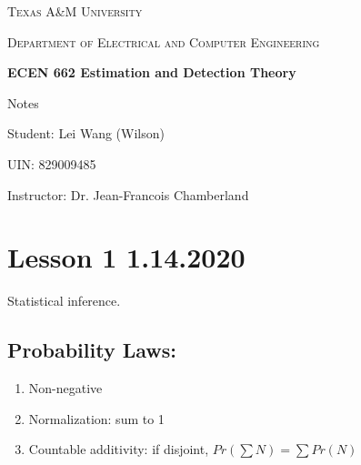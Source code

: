 \documentclass[11pt,letterpaper,titlepage]{article}
\begin{document}
\begin{titlepage}
  \centering
	{\scshape\large Texas A\&M University \par}
	\vspace{1cm}
	{\scshape\Large Department of Electrical and Computer Engineering \par}
	\vspace{4cm}
    \vspace{0.5cm}
	{\huge\bfseries ECEN 662 Estimation and Detection Theory\par}
	\vspace{4cm}
	{\Large Notes\par}
	\vspace{1cm}
	{\Large Student: Lei Wang (Wilson)\par}
	\vspace{1cm}
	{\Large UIN: 829009485\par}
	\vspace{1cm}
	{\Large Instructor: Dr. Jean-Francois Chamberland\par}
	\vspace{4cm}
	\vfill


\end{titlepage}

\newpage

\tableofcontents{}

\newpage

\section{Lesson 1 1.14.2020}

Statistical inference.

\subsection{Probability Laws:}

\begin{enumerate}

    \item Non-negative
    
    \item Normalization: sum to 1
    
    \item Countable additivity: if disjoint, $Pr(\sum N)=\sum Pr(N)$
    
\end{enumerate}
\end{document}
